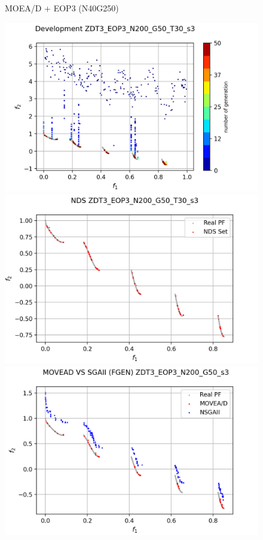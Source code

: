 \begin{minipage}[H]{\linewidth}
\begin{minipage}[b]{0.3\linewidth}
\begin{figure}[H]
        \caption{\centering MOEA/D + EOP3 (N40G250)}
        \label{fig:19}
    \end{figure}
\end{minipage} \quad
\begin{minipage}[b]{0.3\linewidth}
    \begin{figure}[H]
        \centering
        \includegraphics[scale=0.4]{figures/ZDT3_EOP3_N200_G50_T30/s3_dev.png}\\
        \includegraphics[scale=0.36]{figures/ZDT3_EOP3_N200_G50_T30/s3_nds.png}\\
        \includegraphics[scale=0.36]{figures/ZDT3_EOP3_N200_G50_T30/s3_comp.png}\\

\end{figure}
\end{minipage}
\end{minipage}
